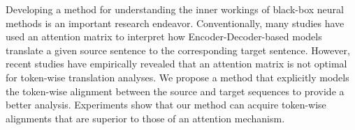 Developing a method for understanding the inner workings of black-box neural methods is an important research endeavor. Conventionally, many studies have used an attention matrix to interpret how Encoder-Decoder-based models translate a given source sentence to the corresponding target sentence. However, recent studies have empirically revealed that an attention matrix is not optimal for token-wise translation analyses. We propose a method that explicitly models the token-wise alignment between the source and target sequences to provide a better analysis. Experiments show that our method can acquire token-wise alignments that are superior to those of an attention mechanism.

